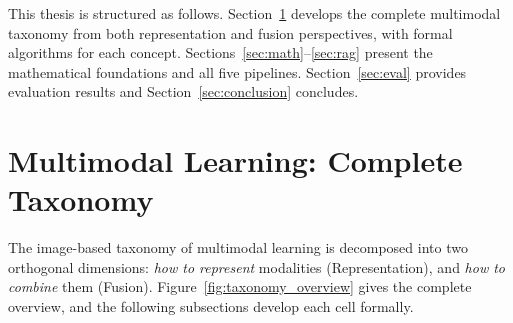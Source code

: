 \documentclass[12pt,a4paper]{article}
\theoremstyle{definition}
\theoremstyle{plain}
\theoremstyle{remark}
\begin{document}
This thesis is structured as follows. Section~\ref{sec:taxonomy} develops the complete multimodal taxonomy from both representation and fusion perspectives, with formal algorithms for each concept. Sections~\ref{sec:math}--\ref{sec:rag} present the mathematical foundations and all five pipelines. Section~\ref{sec:eval} provides evaluation results and Section~\ref{sec:conclusion} concludes.

\newpage
\section{Multimodal Learning: Complete Taxonomy}
\label{sec:taxonomy}

The image-based taxonomy of multimodal learning is decomposed into two orthogonal dimensions: \emph{how to represent} modalities (Representation), and \emph{how to combine} them (Fusion). Figure~\ref{fig:taxonomy_overview} gives the complete overview, and the following subsections develop each cell formally.
\end{document}

